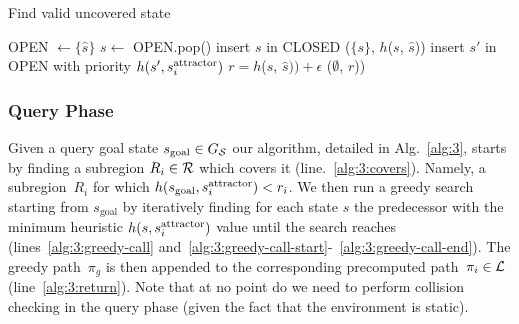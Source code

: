 \documentclass[a4paper]{report}
\begin{document}
\begin{algorithm}[t]
\caption{Find valid uncovered state}\label{alg:3b}

\begin{algorithmic}[1]
\State OPEN $\leftarrow \{\hat{s}\}$
  \State $s \leftarrow$ OPEN.pop()
  \State insert $s$ in CLOSED
    \State \Return ($\{s\}$, $h$($s$, $\hat{s}$))
  \EndIf
        \State insert $s'$ in OPEN with priority $h(s', s^{\text{attractor}}_i)$
    \EndIf
  \EndFor
\EndWhile
\State $r = h$($s$, $\hat{s})) + \epsilon$    
\State \Return ($\emptyset$, $r$))
\EndProcedure
\end{algorithmic}
\end{algorithm}


\subsubsection{Query Phase}
Given a query goal state $s_{\text{goal}} \in G_\mathcal{S}$ 
our algorithm, detailed in Alg.~\ref{alg:3}, starts by finding a subregion $R_i \in \mathcal{R}$ which covers it (line.~\ref{alg:3:covers}). Namely, a subregion~$R_i$ for which 
$h(s_{\text{goal}}, s^{\text{attractor}}_i) < r_i$.
We then run a greedy search starting from $s_{\text{goal}}$ by iteratively finding for each state $s$ the predecessor with the minimum heuristic $h(s, s^{\text{attractor}}_i)$ value until the search reaches \sAttract (lines~\ref{alg:3:greedy-call} and~\ref{alg:3:greedy-call-start}-~\ref{alg:3:greedy-call-end}). 
The greedy path~$\pi_g$ is then appended to the corresponding precomputed path~$\pi_i \in \mathcal{L}$ (line~\ref{alg:3:return}). 
Note that at no point  do we need to perform collision checking in the query phase (given the fact that the environment is static).
\end{document}
